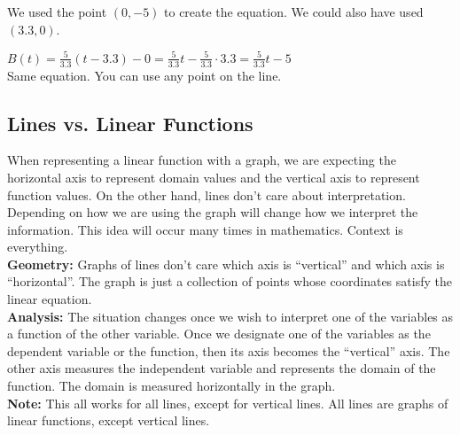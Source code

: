 \documentclass{ximera}
\begin{document}
We used the point $(0, -5)$ to create the equation.  We could also have used $(3.3,0)$.



$B(t) = \frac{5}{3.3} (t - 3.3) - 0 = \frac{5}{3.3} t - \frac{5}{3.3}\cdot 3.3 = \frac{5}{3.3} t -  5$ \\


Same equation.  You can use any point on the line.









\subsection*{Lines vs. Linear Functions}


When representing a linear function with a graph, we are expecting the horizontal axis to represent domain values and the vertical axis to represent function values. On the other hand, lines don't care about interpretation.\\


Depending on how we are using the graph will change how we interpret the information.  This idea will occur many times in mathematics. Context is everything.\\


\textbf{\textcolor{purple!85!blue}{Geometry:}} Graphs of lines don't care which axis is ``vertical'' and which axis is ``horizontal''.  The graph is just a collection of points whose coordinates satisfy the linear equation.  \\

\textbf{\textcolor{purple!85!blue}{Analysis:}} The situation changes once we wish to interpret one of the variables as a function of the other variable. Once we designate one of the variables as the dependent variable or the function, then its axis becomes the ``vertical'' axis.  The other axis measures the independent variable and represents the domain of the function. The domain is measured horizontally in the graph. \\


\textbf{Note:} This all works for all lines, except for vertical lines. All lines are graphs of linear functions, except vertical lines. \\
\end{document}
